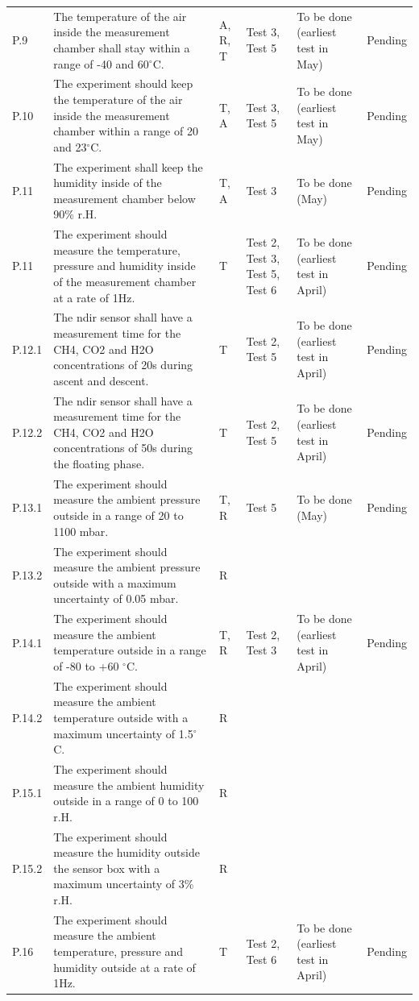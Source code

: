 \documentclass[12pt,a4paper]{report}
\newcommand{\degree}{\ensuremath{^\circ}}
\begin{document}
\begin{longtable}{L{0.7cm}L{5cm}L{1.5cm}L{2cm}L{2.5cm}L{2cm}}
P.9 & The temperature of the air inside the measurement chamber shall stay within a range of -40 and 60\degree C. & A, R, T & Test 3, Test 5 & To be done (earliest test in May) & Pending \\
P.10 & The experiment should keep the temperature of the air inside the measurement chamber within a range of 20 and 23\degree C. & T, A & Test 3, Test 5 & To be done (earliest test in May) & Pending \\
P.11 & The experiment shall keep the humidity inside of the measurement chamber below 90\% r.H. & T, A & Test 3 & To be done (May) & Pending \\
P.11 & The experiment should measure the temperature, pressure and humidity inside of the measurement chamber at a rate of 1Hz. & T & Test 2, Test 3, Test 5, Test 6 & To be done (earliest test in April) & Pending \\
P.12.1 & The \ac{ndir} sensor shall have a measurement time for the CH4, CO2 and H2O concentrations of 20s during ascent and descent. & T & Test 2, Test 5 & To be done (earliest test in April) & Pending \\
P.12.2 & The \ac{ndir} sensor shall have a measurement time for the CH4, CO2 and H2O concentrations of 50s during the floating phase. & T & Test 2, Test 5 & To be done (earliest test in April) & Pending \\
P.13.1 & The experiment should measure the ambient pressure outside in a range of 20 to 1100 mbar. & T, R & Test 5 & To be done (May) & Pending \\
P.13.2 & The experiment should measure the ambient pressure outside with a maximum uncertainty of 0.05 mbar. & R & & & \\
P.14.1 & The experiment should measure the ambient temperature outside in a range of -80 to +60 \degree C. & T, R & Test 2, Test 3 & To be done (earliest test in April) & Pending \\
P.14.2 & The experiment should measure the ambient temperature outside with a maximum uncertainty of 1.5\degree C. & R & & & \\
P.15.1 & The experiment should measure the ambient humidity outside in a range of 0 to 100 r.H. & R & & & \\
P.15.2 & The experiment should measure the humidity outside the sensor box with a maximum uncertainty of 3\% r.H. & R & & & \\
P.16 & The experiment should measure the ambient temperature, pressure and humidity outside at a rate of 1Hz. & T & Test 2, Test 6 & To be done (earliest test in April) & Pending \\

\end{longtable}
\end{document}
